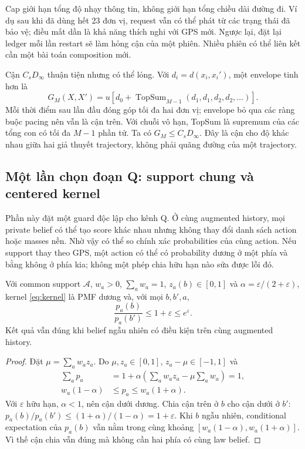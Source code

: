 Cap giới hạn tổng độ nhạy thông tin, không giới hạn tổng chiều dài đường đi. Ví dụ sau khi đã
dùng hết 23 đơn vị, request vẫn có thể phát từ các trạng thái đã bảo vệ; điều mất dần là khả năng
thích nghi với GPS mới. Ngược lại, đặt lại ledger mỗi lần restart sẽ làm hỏng cận của một phiên.
Nhiều phiên có thể liên kết cần một bài toán composition mới.

Cận $C_sD_\infty$ thuận tiện nhưng có thể lỏng. Với $d_i=d(x_i,x_i')$, một envelope tinh hơn là
\begin{equation}
G_M(X,X')=u\!\left[d_0+\operatorname{TopSum}_{M-1}
(d_1,d_1,d_2,d_2,\ldots)\right].
\label{eq:geoi-refined}
\end{equation}
Mỗi thời điểm sau lần đầu đóng góp tối đa hai đơn vị; envelope bỏ qua các ràng buộc pacing nên vẫn
là cận trên. Với chuỗi vô hạn, TopSum là supremum của các tổng con có tối đa $M-1$ phần tử.
Ta có $G_M\le C_sD_\infty$. Đây là cận cho độ khác nhau giữa hai giả thuyết trajectory, không phải
quãng đường của một trajectory.

\subsection{Một lần chọn đoạn Q: support chung và centered kernel}
Phần này đặt một guard độc lập cho kênh Q. Ở cùng augmented history, mọi private belief có thể tạo
score khác nhau nhưng không thay đổi danh sách action hoặc masses nền. Nhờ vậy có thể so chính
xác probabilities của cùng action. Nếu support thay theo GPS, một action có thể có probability
dương ở một phía và bằng không ở phía kia; không một phép chia hữu hạn nào sửa được lỗi đó.

\begin{proposition}\label{prop:q}
Với common support $\mathcal A$, $w_a>0$, $\sum_a w_a=1$, $z_a(b)\in[0,1]$ và
$\alpha=\varepsilon/(2+\varepsilon)$, kernel \eqref{eq:kernel} là PMF dương và, với mọi $b,b',a$,
\begin{equation}
\frac{p_a(b)}{p_a(b')}\le 1+\varepsilon\le e^\varepsilon.
\label{eq:one-q-ratio}
\end{equation}
Kết quả vẫn đúng khi belief ngẫu nhiên có điều kiện trên cùng augmented history.
\end{proposition}
\begin{proof}
Đặt $\mu=\sum_a w_a z_a$. Do $\mu,z_a\in[0,1]$, $z_a-\mu\in[-1,1]$ và
\begin{align}
\sum_a p_a&=1+\alpha\left(\sum_a w_a z_a-\mu\sum_a w_a\right)=1,\nonumber\\
w_a(1-\alpha)&\le p_a\le w_a(1+\alpha).
\label{eq:centered-range}
\end{align}
Với $\varepsilon$ hữu hạn, $\alpha<1$, nên cận dưới dương. Chia cận trên ở $b$ cho cận dưới ở $b'$:
$p_a(b)/p_a(b')\le(1+\alpha)/(1-\alpha)=1+\varepsilon$.
Khi $b$ ngẫu nhiên, conditional expectation của $p_a(b)$ vẫn nằm trong cùng khoảng
$[w_a(1-\alpha),w_a(1+\alpha)]$. Vì thế cận chia vẫn đúng mà không cần hai phía có cùng law belief.
\end{proof}

